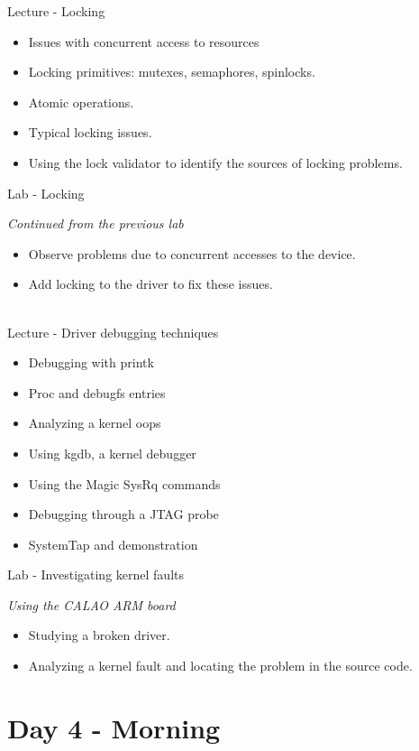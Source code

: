 \documentclass[a4paper,12pt,obeyspaces,spaces,hyphens]{article}
\begin{document}
\feagendatwocolumn
{Lecture - Locking}
{
  \begin{itemize}
  \item Issues with concurrent access to resources
  \item Locking primitives: mutexes, semaphores, spinlocks.
  \item Atomic operations.
  \item Typical locking issues.
  \item Using the lock validator to identify the sources of locking
    problems.
  \end{itemize}
}
{Lab - Locking}
{
  {\em Continued from the previous lab}
  \begin{itemize}
  \item Observe problems due to concurrent accesses to the device.
  \item Add locking to the driver to fix these issues.
  \end{itemize}
}
\\
\feagendatwocolumn
{Lecture - Driver debugging techniques}
{
  \begin{itemize}
  \item Debugging with printk
  \item Proc and debugfs entries
  \item Analyzing a kernel oops
  \item Using kgdb, a kernel debugger
  \item Using the Magic SysRq commands
  \item Debugging through a JTAG probe
  \item SystemTap and demonstration
  \end{itemize}
}
{Lab - Investigating kernel faults}
{
 {\em Using the CALAO ARM board}
  \begin{itemize}
  \item Studying a broken driver.
  \item Analyzing a kernel fault and locating the problem in the
    source code.
  \end{itemize}
}
\section{Day 4 - Morning}
\end{document}
